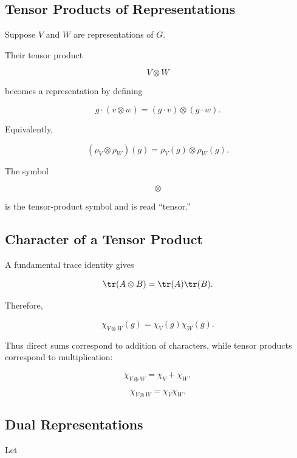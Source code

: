 \subsection{Tensor Products of Representations}
\label{subsec:tensor-product-representations}

Suppose \(V\) and \(W\) are representations of \(G\).

Their tensor product

\[ V\otimes W \]

becomes a representation by defining

\[ g\cdot(v\otimes w)=(g\cdot v)\otimes(g\cdot w). \]

Equivalently,

\[ (\rho_V\otimes\rho_W)(g)
=\rho_V(g)\otimes\rho_W(g). \]

The symbol

\[ \otimes \]

is the tensor-product symbol and is read ``tensor.''

\subsection{Character of a Tensor Product}
\label{subsec:character-tensor-product}

A fundamental trace identity gives

\[ \tr(A\otimes B)=\tr(A)\tr(B). \]

Therefore,

\[ \boxed{\chi_{V\otimes W}(g)=\chi_V(g)\chi_W(g).} \]

Thus direct sums correspond to addition of characters, while tensor products
correspond to multiplication:

\[ \chi_{V\oplus W}=\chi_V+\chi_W, \]

\[ \chi_{V\otimes W}=\chi_V\chi_W. \]

\subsection{Dual Representations}
\label{subsec:dual-representations}

Let

